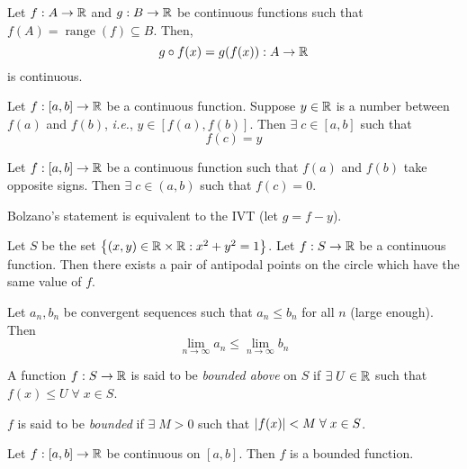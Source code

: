 \documentclass[12pt]{article}
\begin{document}
\begin{thm} \label{thm:compositions}
    Let $f: A \to \mathbb{R}$ and $g: B \to \mathbb{R}$ be continuous functions such that $f(A) = \mathop{range}(f) \subseteq B$. Then, \[
        g \circ f(x) = g(f(x)) : A \to \mathbb{R}
    \] is continuous.
\end{thm}

\begin{thm} \label{thm:intermediate value}
    Let $f: [a, b] \to \mathbb{R}$ be a continuous function. Suppose $y \in \mathbb{R}$ is a number between $f(a)$ and $f(b)$, \textit{i.e.}, $y \in [f(a), f(b)]$. Then $\exists\; c \in [a, b]$ such that \[
        f(c) = y
    \]
\end{thm}

\begin{cor}[Bolzano] \label{cor:bolzano}
    Let $f : [a, b] \to \mathbb{R}$ be a continuous function such that $f(a)$ and $f(b)$ take opposite signs. Then $\exists\; c \in (a, b)$ such that $f(c) = 0$.
\end{cor}

\begin{rem}
    Bolzano's statement is equivalent to the IVT (let $g = f - y$).
\end{rem}

\begin{thm} \label{thm:borsuk-ulam}
    Let $S$ be the set $\set{(x, y) \in \R \times \R : x^{2} + y^{2} = 1}$. Let $f: S \to \mathbb{R}$ be a continuous function. Then there exists a pair of antipodal points on the circle which have the same value of $f$.
\end{thm}

\begin{lem} \label{lem:comparison of seq}
    Let $a_{n}, b_{n}$ be convergent sequences such that $a_{n} \leq b_{n}$ for all $n$ (large enough). Then \[
        \lim_{n \to \infty} a_{n} \leq \lim_{n \to \infty} b_{n}
    \]
\end{lem}

\begin{defn} \label{defn:bounded fn}
    A function $f : S \to \mathbb{R}$ is said to be \emph{bounded above} on $S$ if $\exists\; U \in \mathbb{R}$ such that $f(x) \leq U \;\forall\; x \in S$.

    $f$ is said to be \emph{bounded} if $\exists\; M > 0$ such that $\abs{ f(x) } < M \;\forall\; x \in S$.
\end{defn}

\begin{thm} \label{thm:closed bounded}
    Let $f : [a, b] \to \mathbb{R}$ be continuous on $[a, b]$. Then $f$ is a bounded function.
\end{thm}
\end{document}
